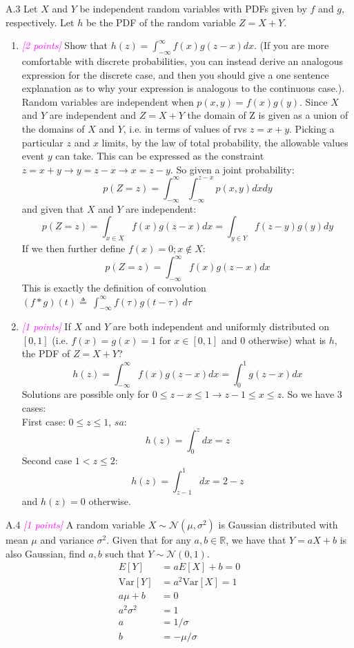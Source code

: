\documentclass{article}
\newcommand{\field}[1]{\mathbb{#1}}
\newcommand{\1}{\mathbf{1}}
\newcommand{\R}{\field{R}} %
\newcommand{\points}[1]{\small\textcolor{magenta}{\emph{[#1 points]}} \normalsize}
\begin{document}
A.3 Let $X$ and $Y$ be independent random variables with PDFs given by $f$ and $g$, respectively. Let $h$ be the PDF of the random variable $Z = X+Y$.
\begin{enumerate}
	\item \points{2} Show that $h(z) = \int_{-\infty}^\infty f(x) g( z - x ) d x $.  (If you are more comfortable with discrete probabilities, you can instead derive an analogous expression for the discrete case,  and then you should give a one sentence explanation as to why your expression is analogous to the continuous case.). \\
	Random variables are independent when $p(x,y) = f(x)g(y)$. Since $X$ and $Y$ are independent and $Z=X+Y$ the domain of Z is given as a union of the domains of $X$ and $Y$, i.e. in terms of values of rvs $z=x+y$. Picking a particular $z$ and $x$ limits, by the law of total probability, the allowable values event $y$ can take. This can be expressed as the constraint $z=x+y \rightarrow y=z-x \rightarrow x=z-y$. So given a joint probability: 
	$$p(Z=z) = \int_{-\infty}^\infty\int_{-\infty}^{z-x} p(x,y)dxdy$$
	and given that $X$ and $Y$ are independent: 
	$$p(Z=z) = \int_{x\in X} f(x)g(z-x)dx = \int_{y\in Y} f(z-y)g(y)dy$$
	If we then further define $f(x)=0; x\not\in X$:
	$$p(Z=z) =  \int_{-\infty}^\infty f(x)g(z-x)dx $$
	This is exactly the definition of convolution $(f * g)(t) \triangleq\ \int_{-\infty}^\infty f(\tau) g(t - \tau) \, d\tau$

	\item \points{1} If $X$ and $Y$ are both independent and uniformly distributed on $[0,1]$ (i.e. $f(x)=g(x)=1$ for $x \in [0,1]$ and $0$ otherwise) what is $h$, the PDF of $Z=X+Y$? \\
    $$h(z) = \int_{-\infty}^\infty f(x)g(z-x)dx = \int_0^1g(z-x)dx$$
    Solutions are possible only for $0 \leq z-x \leq 1 \rightarrow z-1 \leq x \leq z$. So we have 3 cases:\\ First case: $0\leq z\leq 1$, $sa$:
    $$h(z) = \int_0^zdx = z$$
    Second case $1 < z \leq 2$: 
    $$h(z) = \int_{z-1}^1dx = 2-z$$
    and $h(z)=0$ otherwise. 
\end{enumerate}

A.4 \points{1} A random variable $X \sim \mathcal{N}(\mu, \sigma^2)$ is Gaussian distributed with mean $\mu$ and variance $\sigma^2$. Given that for any $a,b \in \R$, we have that $Y = aX + b$ is also Gaussian, find $a,b$ such that $Y \sim \mathcal{N}(0,1)$.
\begin{align*}
    E[Y] &= aE[X]+b = 0\\
    \text{Var}[Y] &= a^2\text{Var}[X] = 1\\
    a\mu + b &= 0\\
    a^2\sigma^2 &= 1\\
    a &= 1/\sigma\\
    b &= - \mu/\sigma\\
\end{align*}
\end{document}
